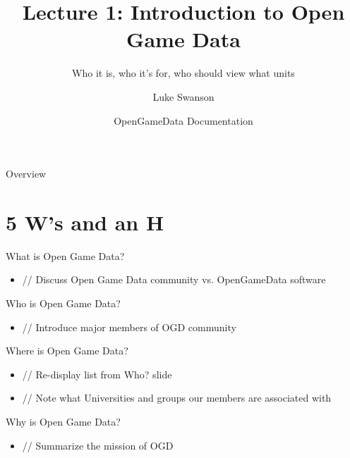 \documentclass{beamer}
\title[Intro to OGD] %
{Lecture 1: Introduction to Open Game Data}
\subtitle
{Who it is, who it's for, who should view what units} %
\author[Swanson] %
{Luke Swanson}
\institute[University of Wisconsin-Madison] %
{
  Field Day Lab\\
  University of Wisconsin-Madison
}
\date[OGD Docs] %
{OpenGameData Documentation}
\begin{document}
\begin{frame}
  \titlepage
\end{frame}

\begin{frame}{Overview}
  \tableofcontents
\end{frame}




\section[Questions]{5 W's and an H}

\begin{frame}{What is Open Game Data?}
  \begin{itemize}
  \item
    // Discuss Open Game Data community vs. OpenGameData software
    \pause
  \end{itemize}
\end{frame}

\begin{frame}{Who is Open Game Data?}
  \begin{itemize}
  \item
    // Introduce major members of OGD community
    \pause
  \end{itemize}
\end{frame}

\begin{frame}{Where is Open Game Data?}
  \begin{itemize}
    \item // Re-display list from Who? slide
    \pause
    \item // Note what Universities and groups our members are associated with
    \pause
  \end{itemize}
\end{frame}

\begin{frame}{Why is Open Game Data?}
  \begin{itemize}
  \item
    // Summarize the mission of OGD
    \pause
  \end{itemize}
\end{frame}
\end{document}
